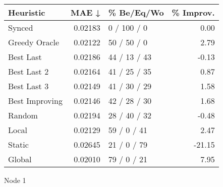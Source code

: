 \begin{tabular}{lrlr}
\toprule
\textbf{Heuristic} & \textbf{MAE ↓} & \textbf{\% Be/Eq/Wo} & \textbf{\% Improv.} \\
\midrule
            Synced &        0.02183 &          0 / 100 / 0 &                0.00 \\
     Greedy Oracle &        0.02122 &          50 / 50 / 0 &                2.79 \\
         Best Last &        0.02186 &         44 / 13 / 43 &               -0.13 \\
       Best Last 2 &        0.02164 &         41 / 25 / 35 &                0.87 \\
       Best Last 3 &        0.02149 &         41 / 30 / 29 &                1.58 \\
    Best Improving &        0.02146 &         42 / 28 / 30 &                1.68 \\
            Random &        0.02194 &         28 / 40 / 32 &               -0.48 \\
             Local &        0.02129 &          59 / 0 / 41 &                2.47 \\
            Static &        0.02645 &          21 / 0 / 79 &              -21.15 \\
            Global &        0.02010 &          79 / 0 / 21 &                7.95 \\
\bottomrule
\end{tabular}
\caption{Node 1}
\label{tab:iid_lr01_le1_bs2_1}
